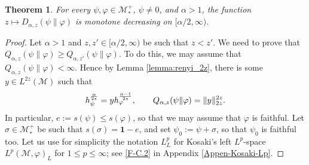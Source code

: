 \documentclass[12pt]{article}
\newtheorem{theorem}{Theorem}[section]
\theoremstyle{definition}
\theoremstyle{remark}
\numberwithin{equation}{section}
\def\Me{\mathcal M}
\def\ffi{\varphi}
\def\1{\mathbf{1}}
\begin{document}
\begin{theorem}\label{T-5.7}
For every $\psi,\ffi\in\Me_*^+$, $\psi\ne0$, and $\alpha>1$, the function $z\mapsto D_{\alpha,z}(\psi\|\varphi)$
is monotone decreasing on $[\alpha/2,\infty)$.
\end{theorem}

\begin{proof}
Let $\alpha>1$ and $z,z'\in[\alpha/2,\infty)$ be such that $z<z'$. We need to prove that
$Q_{\alpha,z}(\psi\|\ffi)\ge Q_{\alpha,z'}(\psi\|\ffi)$. To do this, we may assume that
$Q_{\alpha,z}(\psi\|\ffi)<\infty$. Hence by Lemma \ref{lemma:renyi_2z}, there is some $y\in L^{2z}(\Me)$
such that
\[
h_\psi^{\alpha\over2z}=yh_\ffi^{\alpha-1\over2z},\qquad
Q_{\alpha,z}(\psi\|\ffi)=\|y\|_{2z}^{2z}.
\]
In particular, $e:=s(\psi)\le s(\ffi)$, so that we may assume that $\ffi$ is faithful. Let $\sigma\in\Me_*^+$
be such that $s(\sigma)=\1-e$, and set $\psi_0:=\psi+\sigma$, so that $\psi_0$ is faithful too. Let us use
for simplicity the notation $L^p_L$ for Kosaki's left $L^p$-space $L^p(\Me,\ffi)_L$ for $1\le p\le\infty$;
see \eqref{F-C.2} in Appendix \ref{Appen-Kosaki-Lp}.


\end{proof}
\end{document}
